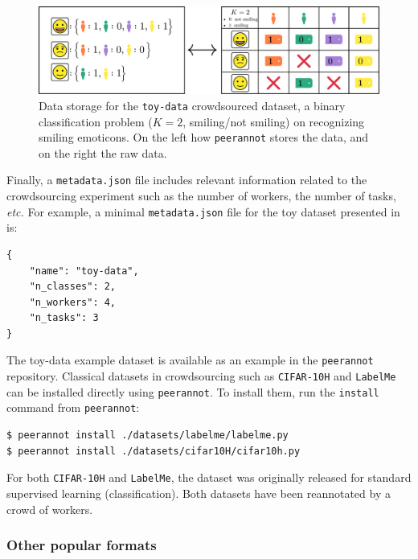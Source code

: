 \begin{figure}[htb]
\centering
\includegraphics[width=\textwidth]{./images/json_answers.pdf}
\caption{Data storage for the \texttt{toy-data} crowdsourced dataset, a binary classification problem ($K=2$, smiling/not smiling) on recognizing smiling emoticons. On the left how \texttt{peerannot} stores the data, and on the right the raw data.}
\label{fig:toy-data}
\end{figure}

Finally, a \texttt{metadata.json} file includes relevant information related to the crowdsourcing experiment such as the number of workers, the number of tasks, \emph{etc.} For example, a minimal \texttt{metadata.json} file for the toy dataset presented in  is:
\begin{verbatim}
{
    "name": "toy-data",
    "n_classes": 2,
    "n_workers": 4,
    "n_tasks": 3
}
\end{verbatim}


The toy-data example dataset is available as an example in the \texttt{peerannot} repository. Classical datasets in crowdsourcing such as \texttt{CIFAR-10H} \citep{peterson_human_2019} and \texttt{LabelMe} \citep{rodrigues2014gaussian} can be installed directly using \texttt{peerannot}. To install them, run the \texttt{install} command from \texttt{peerannot}:

\begin{verbatim}
$ peerannot install ./datasets/labelme/labelme.py
$ peerannot install ./datasets/cifar10H/cifar10h.py
\end{verbatim}

For both \texttt{CIFAR-10H} and \texttt{LabelMe}, the dataset was originally released for standard supervised learning (classification). Both datasets have been reannotated by a crowd of workers.

\subsubsection{Other popular formats}

